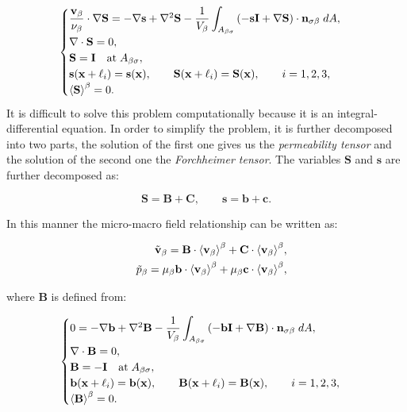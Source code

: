 \begin{eqnarray}
	\begin{cases}
		\dfrac{\textbf{v}_{\beta}}{\nu_{\beta}} \cdot  \nabla \mathbf{S} = -\nabla \mathbf{s} + \nabla^2 \mathbf{S} - \dfrac{1}{V_\beta} \displaystyle \int_{A_{\beta \sigma}} \left(-\mathbf{s}\mathbf{I}  +  \nabla \mathbf{S} \right) \cdot \mathbf{n}_{\sigma \beta} \;dA,  \\
		\nabla \cdot \mathbf{S} = 0, \\
		\mathbf{S} = \mathbf{I} \quad \textrm{at} \; A_{\beta \sigma}, \\
		\mathbf{s}(\mathbf{x} +\ell_i) = \mathbf{s}(\mathbf{x}), \qquad \mathbf{S}(\mathbf{x} +\ell_i) = \mathbf{S}(\mathbf{x}), \qquad i=1,2,3 ,\\
		{\left< \mathbf{S} \right>}^{\beta} = 0.
	\end{cases}
\label{eq:R_problem}
\end{eqnarray}
It is difficult to solve this problem computationally because it is an integral-differential equation.
In order to simplify the problem, it is further decomposed into two parts, the solution of the first one gives us the \textit{permeability tensor} and the solution of the second one the \textit{Forchheimer tensor}. The variables $\mathbf{S}$ and $\mathbf{s}$ are further decomposed as:

$$
 \mathbf{S} = \mathbf{B} + \mathbf{C}, \qquad \mathbf{s} = \mathbf{b} + \mathbf{c}.
$$

\noindent In this manner the micro-macro field relationship can be written as:

\begin{eqnarray}
	&& \tilde{\textbf{v}}_{\beta} = \mathbf{B} \cdot {\left< \textbf{v}_{\beta}\right>}^{\beta} + \mathbf{C} \cdot {\left< \textbf{v}_{\beta}\right>}^{\beta},  	\label{eq:closure_viab_divison} \\
	&& \tilde{p}_{\beta} = \mu_{\beta} \mathbf{b} \cdot {\left< \textbf{v}_{\beta}\right>}^{\beta} + \mu_{\beta} \mathbf{c} \cdot {\left< \textbf{v}_{\beta}\right>}^{\beta}, \label{eq:closure_viab_hp}
\end{eqnarray}

where $\mathbf{B}$ is defined from:

\begin{eqnarray}
	\begin{cases}
		0 = -\nabla \mathbf{b} + \nabla^2 \mathbf{B} - \dfrac{1}{V_\beta} \displaystyle \int_{A_{\beta \sigma}}  \left(-\mathbf{b}\mathbf{I}  +  \nabla \mathbf{B} \right) \cdot \mathbf{n}_{\sigma \beta} \;dA,  \\
		\nabla \cdot \mathbf{B} = 0,  \\
		\mathbf{B} = -\mathbf{I} \quad \textrm{at} \; A_{\beta \sigma}, \\
		\mathbf{b}(\mathbf{x} +\ell_i) = \mathbf{b}(\mathbf{x}), \qquad \mathbf{B}(\mathbf{x} +\ell_i) = \mathbf{B}(\mathbf{x}), \qquad i=1,2,3 , \\
		{\left< \mathbf{B} \right>}^{\beta} = 0.
	\end{cases}
\label{eq:B_problem}
\end{eqnarray}

